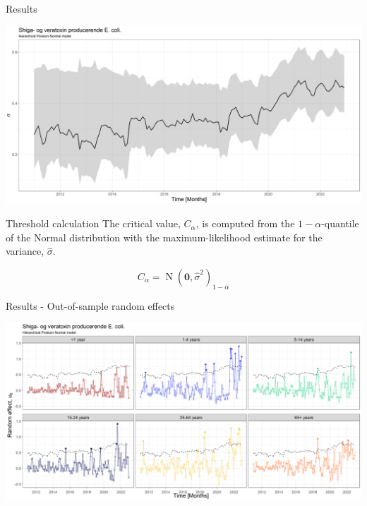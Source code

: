 \documentclass[aspectratio=169]{beamer}
\DeclareMathOperator{\N}{N}
\begin{document}
\begin{frame}{Results}
\protect\hypertarget{results-1}{}
\tiny

\includegraphics[width=1\linewidth]{../figures/phiSTECPoisNExclude}

\normalsize
\end{frame}

\begin{frame}{Threshold calculation}
\protect\hypertarget{threshold-calculation}{}
The critical value, \(C_\alpha\), is computed from the
\(1-\alpha\)-quantile of the Normal distribution with the
maximum-likelihood estimate for the variance, \(\hat\sigma\).

\begin{equation}
  C_\alpha=\N(\boldsymbol{0},\hat\sigma^2)_{1-\alpha}
\end{equation}
\end{frame}

\begin{frame}{Results - Out-of-sample random effects}
\protect\hypertarget{results---out-of-sample-random-effects}{}
\tiny

\includegraphics[width=1\linewidth]{../figures/windowedSTEDPoisNExclude}

\normalsize
\end{frame}
\end{document}
